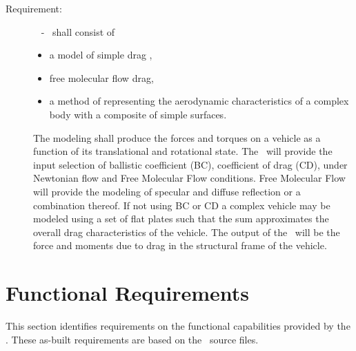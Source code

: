 \label{reqt:AD}
\begin{description}
  \item[Requirement:]\ \newline
    \label{reqt:DAD} -
      \aerodynamicsDesc\ shall consist of
\begin{itemize}
\item a model of simple drag ,
\item free molecular flow drag,
\item a method of representing the aerodynamic characteristics of a complex body with a composite of simple surfaces.
\end{itemize}

The modeling shall produce the forces and
      torques on a vehicle as a function of its translational and
      rotational state. The \aerodynamicsDesc\ will provide the input selection
      of ballistic coefficient (BC), coefficient of drag (CD), under
      Newtonian flow and Free Molecular Flow conditions. Free Molecular
      Flow will provide the modeling of specular and diffuse reflection or
      a combination thereof. If not using BC or CD a complex vehicle may
      be modeled using a set of flat plates such that the sum approximates
      the overall drag characteristics of the vehicle. The output of the
      \aerodynamicsDesc\ will be the force and moments due to drag in the structural
frame of the vehicle.
\end{description}

\section{Functional Requirements}\label{sec:func_reqts}
This section identifies requirements on the functional capabilities
provided by the \aerodynamicsDesc.  These as-built requirements are based on the
\aerodynamicsDesc\ source files.

